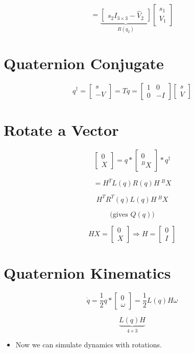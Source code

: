 \documentclass[11pt]{article}
\begin{document}
\[
=
\underbrace{
\begin{bmatrix}
    s_2 I_{3\times3} - \hat{V}_2
\end{bmatrix}
}_{R(q_2)}
\begin{bmatrix}
    s_1 \\ V_1
\end{bmatrix}
\]

\section*{Quaternion Conjugate}

\[
q^\dagger =
\begin{bmatrix}
    s \\
    -V
\end{bmatrix}
=
T q =
\begin{bmatrix}
    1 & 0 \\
    0 & -I
\end{bmatrix}
\begin{bmatrix}
    s \\
    V
\end{bmatrix}
\]

\section*{Rotate a Vector}

\[
\begin{bmatrix}
    0 \\ X
\end{bmatrix}
=
q *
\begin{bmatrix}
    0 \\ ^B X
\end{bmatrix}
* q^\dagger
\]

\[
=
H^T L(q) R(q) H \ ^B X
\]

\[
H^T R^T(q) L(q) H\ ^B X
\]

\[
\text{(gives } Q(q) \text{)}
\]

\[
H X =
\begin{bmatrix}
    0 \\ X
\end{bmatrix}
\Rightarrow
H =
\begin{bmatrix}
    0 \\ I
\end{bmatrix}
\]
\section*{Quaternion Kinematics}

\[
\dot{q} = \frac{1}{2} q * 
\begin{bmatrix}
    0 \\ \omega
\end{bmatrix}
= \frac{1}{2} L(q) H \omega
\]

\[
\underbrace{L(q) H}_{4 \times 3}
\]

\begin{itemize}
    \item Now we can simulate dynamics with rotations.
\end{itemize}
\end{document}
